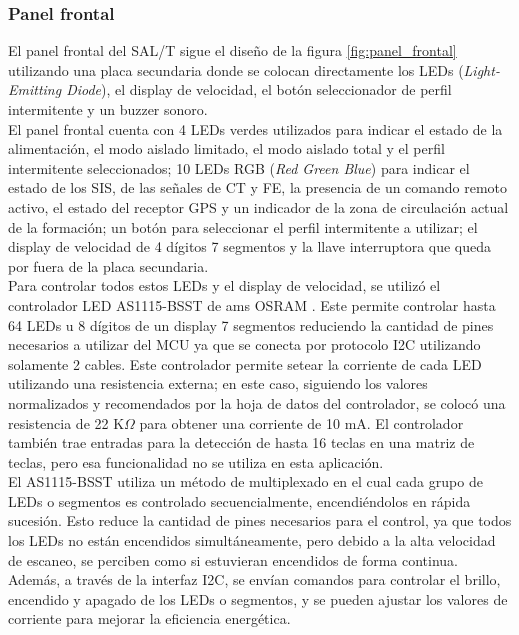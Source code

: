 \subsubsection{Panel frontal}


El panel frontal del SAL/T sigue el diseño de la figura \ref{fig:panel_frontal} utilizando una placa secundaria donde se colocan directamente los LEDs (\textit{Light-Emitting Diode}), el display de velocidad, el botón seleccionador de perfil intermitente y un buzzer sonoro. \\ 

El panel frontal cuenta con 4 LEDs verdes utilizados para indicar el estado de la alimentación, el modo aislado limitado, el modo aislado total y el perfil intermitente seleccionados; 10 LEDs RGB (\textit{Red Green Blue}) para indicar el estado de los SIS, de las señales de CT y FE, la presencia de un comando remoto activo, el estado del receptor GPS y un indicador de la zona de circulación actual de la formación; un botón para seleccionar el perfil intermitente a utilizar; el display de velocidad de 4 dígitos 7 segmentos y la llave interruptora que queda por fuera de la placa secundaria. \\ 

Para controlar todos estos LEDs y el display de velocidad, se utilizó el controlador LED AS1115-BSST de ams OSRAM \cite{AS1115-BSST}. Este permite controlar hasta 64 LEDs u 8 dígitos de un display 7 segmentos reduciendo la cantidad de pines necesarios a utilizar del MCU ya que se conecta por protocolo I2C utilizando solamente 2 cables. Este controlador permite setear la corriente de cada LED utilizando una resistencia externa; en este caso, siguiendo los valores normalizados y recomendados por la hoja de datos del controlador, se colocó una resistencia de 22 K$\Omega$ para obtener una corriente de 10 mA. El controlador también trae entradas para la detección de hasta 16 teclas en una matriz de teclas, pero esa funcionalidad no se utiliza en esta aplicación. \\



El AS1115-BSST utiliza un método de multiplexado en el cual cada grupo de LEDs o segmentos es controlado secuencialmente, encendiéndolos en rápida sucesión. Esto reduce la cantidad de pines necesarios para el control, ya que todos los LEDs no están encendidos simultáneamente, pero debido a la alta velocidad de escaneo, se perciben como si estuvieran encendidos de forma continua. Además, a través de la interfaz I2C, se envían comandos para controlar el brillo, encendido y apagado de los LEDs o segmentos, y se pueden ajustar los valores de corriente para mejorar la eficiencia energética.\\




